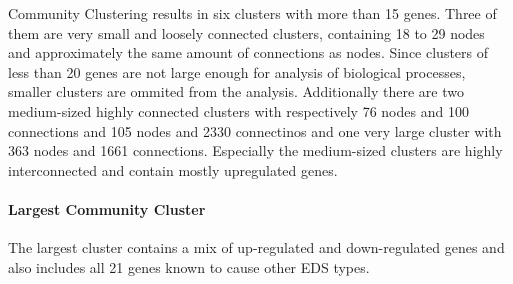 Community Clustering results in six clusters with more than 15 genes. Three of them are very small and loosely connected clusters, containing 18 to 29 nodes and approximately the same amount of connections as nodes. Since clusters of less than 20 genes are not large enough for analysis of biological processes, smaller clusters are ommited from the analysis. Additionally there are two medium-sized highly connected clusters with respectively 76 nodes and 100 connections and 105 nodes and 2330 connectinos and one very large cluster with 363 nodes and 1661 connections. Especially the medium-sized clusters are highly interconnected and contain mostly upregulated genes.

\paragraph{Largest Community Cluster}

The largest cluster contains a mix of up-regulated and down-regulated genes and also includes all 21 genes known to cause other EDS types.


